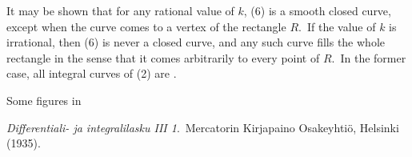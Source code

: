 \documentclass[12pt]{article}
\theoremstyle{definition}
\begin{document}
It may be shown that for any rational value of $k$, (6) is a smooth closed curve, except when the curve comes to a vertex of the rectangle $R$.\, If the value of $k$ is irrational, then (6) is never a closed curve, and any such curve fills the whole rectangle in the sense that it comes arbitrarily  to every point of $R$.\, In the former case, all integral curves of (2) are . 

Some figures in 

\begin{thebibliography}{9}
 {\em Differentiali- ja integralilasku III 1}.\, Mercatorin Kirjapaino Osakeyhti\"o, Helsinki (1935).
\end{thebibliography}

\end{document}
